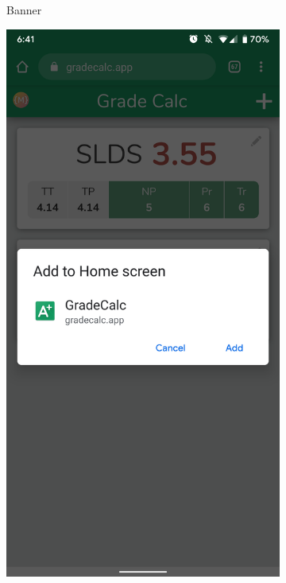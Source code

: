 \begin{figure}[ht!]
\begin{subfigure}[b]{0.25\textwidth-0.1cm}
        \caption{Banner}
        \label{fig:install-banner}
    \end{subfigure}
    \hfill
    \begin{subfigure}[b]{0.25\textwidth-0.1cm}
        \centering
        \includegraphics[width=\textwidth]{media/screenshots/screenshot-install-popup.png}

\end{subfigure}
\end{figure}
